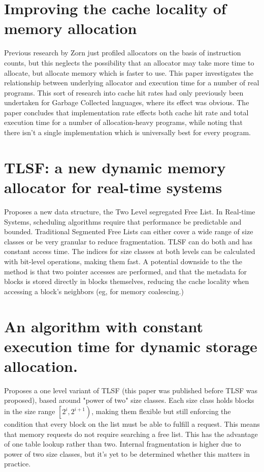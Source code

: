 \documentclass{report}
\begin{document}
\section[Cache Locality]{Improving the cache locality of memory allocation}
Previous research by Zorn just profiled allocators on the basis of instruction counts, but this neglects the possibility that an allocator may take more time to allocate, but allocate memory which is faster to use. This paper investigates the relationship between underlying allocator and execution time for a number of real programs. This sort of research into cache hit rates had only previously been undertaken for Garbage Collected languages, where its effect was obvious. The paper concludes that implementation rate effects both cache hit rate and total execution time for a number of allocation-heavy programs, while noting that there isn't a single implementation which is universally best for every program. \cite{10.1145/173262.155107}

\section[TLSF]{TLSF: a new dynamic memory allocator for real-time systems}
Proposes a new data structure, the Two Level segregated Free List. In Real-time Systems, scheduling algorithms require that performance be predictable and bounded. Traditional Segmented Free Lists can either cover a wide range of size classes or be very granular to reduce fragmentation. TLSF can do both and has constant access time. The indices for size classes at both levels can be calculated with bit-level operations, making them fast. A potential downside to the the method is that two pointer accesses are performed, and that the metadata for blocks is stored directly in blocks themselves, reducing the cache locality when accessing a block's neighbors (eg, for memory coalescing.)  \cite{inproceedings}

\section[Constant Allocator]{An algorithm with constant execution time for dynamic storage allocation.}
Proposes a one level variant of TLSF (this paper was published before TLSF was proposed), based around "power of two" size classes. Each size class holds blocks in the size range $\left[2^i, 2^{i + 1}\right)$, making them flexible but still enforcing the condition that every block on the list must be able to fulfill a request. This means that memory requests do not require searching a free list. This has the advantage of one table lookup rather than two. Internal fragmentation is higher due to power of two size classes, but it's yet to be determined whether this matters in practice. \cite{528746}
\end{document}
